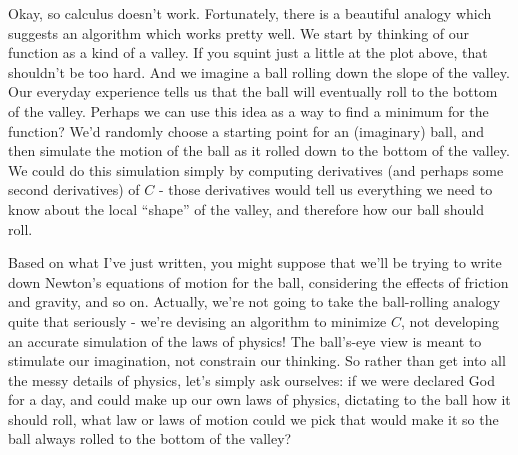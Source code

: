Okay, so calculus doesn't work. Fortunately, there is a beautiful analogy which suggests an algorithm which works pretty well. We start by thinking of our function as a kind of a valley. If you squint just a little at the plot above, that shouldn't be too hard. And we imagine a ball rolling down the slope of the valley. Our everyday experience tells us that the ball will eventually roll to the bottom of the valley. Perhaps we can use this idea as a way to find a minimum for the function? We'd randomly choose a starting point for an (imaginary) ball, and then simulate the motion of the ball as it rolled down to the bottom of the valley. We could do this simulation simply by computing derivatives (and perhaps some second derivatives) of $C$ - those derivatives would tell us everything we need to know about the local ``shape'' of the valley, and therefore how our ball should roll.

Based on what I've just written, you might suppose that we'll be trying to write down Newton's equations of motion for the ball, considering the effects of friction and gravity, and so on. Actually, we're not going to take the ball-rolling analogy quite that seriously - we're devising an algorithm to minimize $C$, not developing an accurate simulation of the laws of physics! The ball's-eye view is meant to stimulate our imagination, not constrain our thinking. So rather than get into all the messy details of physics, let's simply ask ourselves: if we were declared God for a day, and could make up our own laws of physics, dictating to the ball how it should roll, what law or laws of motion could we pick that would make it so the ball always rolled to the bottom of the valley?

